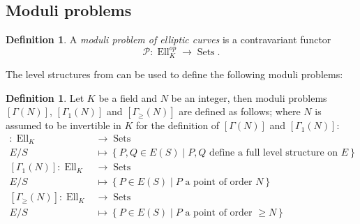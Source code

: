 \documentclass[a4paper,12pt,reqno]{amsart}
\newcommand{\set}[1]{\left\lbrace #1 \right\rbrace}
\DeclareMathOperator{\Sets}{Sets}
\DeclareMathOperator{\Ell}{Ell}
\theoremstyle{definition}
\newtheorem{definition}[lemma]{Definition}
\numberwithin{lemma}{section}
\numberwithin{equation}{section}
\numberwithin{figure}{section}
\begin{document}
\subsection{Moduli problems}

\begin{definition}
A \textit{moduli problem of elliptic curves} is a contravariant functor $$\mathcal P: \Ell_K^{op} \to \Sets.$$
\end{definition}

The level structures from  can be used to define the following moduli problems:
\begin{definition}\label{def:several-moduli-problems}Let $K$ be a field and $N$ be an integer, then moduli problems $[\Gamma(N)]$, $[\Gamma_1(N)]$ and $[\Gamma_\geq(N)]$ are defined as follows; where $N$ is assumed to be invertible in $K$ for the definition of $[\Gamma(N)]$ and $[\Gamma_1(N)]$:
	\begin{align*}
	[\Gamma(N)] : \Ell_K &\to \Sets \\
	  E/S &\mapsto \set{ P,Q \in E(S) \mid P,Q \text{ define a full level structure on } E}\\
	  	[\Gamma_1(N)] : \Ell_K &\to \Sets \\
	  E/S &\mapsto \set{ P \in E(S) \mid P \text{ a point of order } N}\\
	  	[\Gamma_\geq (N)] : \Ell_K &\to \Sets \\
	  E/S &\mapsto \set{ P \in E(S) \mid P \text{ a point of order } \geq N}\\
	\end{align*}
\end{definition}
\end{document}
